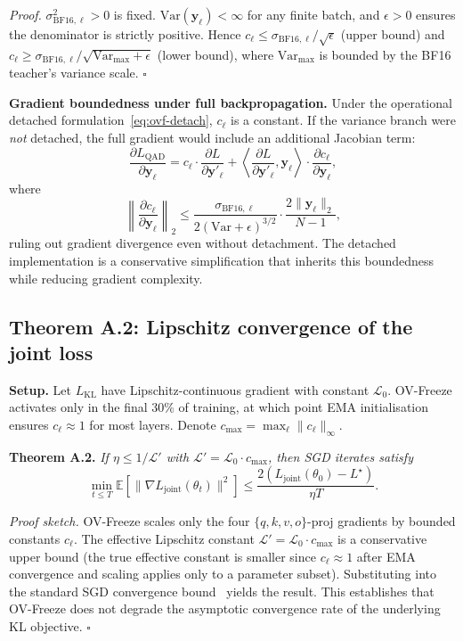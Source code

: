 \documentclass[lettersize,journal]{IEEEtran}
\begin{document}
\textit{Proof.}  $\sigma^2_{\mathrm{BF16},\ell}>0$ is fixed.
$\mathrm{Var}(\bm{y}_\ell)<\infty$ for any finite batch, and
$\epsilon>0$ ensures the denominator is strictly positive.  Hence
$c_\ell \le \sigma_{\mathrm{BF16},\ell}/\sqrt{\epsilon}$ (upper
bound) and $c_\ell \ge \sigma_{\mathrm{BF16},\ell}/\sqrt{
\mathrm{Var}_{\max}+\epsilon}$ (lower bound), where
$\mathrm{Var}_{\max}$ is bounded by the BF16 teacher's variance
scale. $\square$

\textbf{Gradient boundedness under full backpropagation.}
Under the operational detached formulation~\eqref{eq:ovf-detach},
$c_\ell$ is a constant.  If the variance branch were \emph{not}
detached, the full gradient would include an additional Jacobian term:
\[
  \frac{\partial L_{\mathrm{QAD}}}{\partial\bm{y}_\ell}
    = c_\ell\!\cdot\!\frac{\partial L}{\partial\bm{y}'_\ell}
    + \left\langle\frac{\partial L}{\partial\bm{y}'_\ell},\bm{y}_\ell\right\rangle
      \!\cdot\!\frac{\partial c_\ell}{\partial\bm{y}_\ell},
\]
where
\[
  \left\|\frac{\partial c_\ell}{\partial\bm{y}_\ell}\right\|_2
    \le \frac{\sigma_{\mathrm{BF16},\ell}}{2(\mathrm{Var}+\epsilon)^{3/2}}
        \cdot\frac{2\|\bm{y}_\ell\|_2}{N-1},
\]
ruling out gradient divergence even without detachment.  The detached
implementation is a conservative simplification that inherits this
boundedness while reducing gradient complexity.

\subsection{Theorem A.2: Lipschitz convergence of the joint loss}

\textbf{Setup.}  Let $L_{\mathrm{KL}}$ have Lipschitz-continuous
gradient with constant $\mathcal{L}_0$.  OV-Freeze activates only
in the final 30\% of training, at which point EMA initialisation
ensures $c_\ell \approx 1$ for most layers.  Denote $c_{\max} =
\max_\ell\|c_\ell\|_\infty$.

\textbf{Theorem A.2.}  \emph{If $\eta \le 1/\mathcal{L}'$ with
$\mathcal{L}'=\mathcal{L}_0\cdot c_{\max}$, then SGD iterates satisfy}
\[
  \min_{t\le T}\mathbb{E}\!\left[\|\nabla L_{\mathrm{joint}}(\theta_t)\|^2\right]
    \le \frac{2(L_{\mathrm{joint}}(\theta_0)-L^\star)}{\eta T}.
\]

\textit{Proof sketch.}  OV-Freeze scales only the four
$\{q,k,v,o\}$-proj gradients by bounded constants $c_\ell$.  The
effective Lipschitz constant $\mathcal{L}' = \mathcal{L}_0 \cdot
c_{\max}$ is a conservative upper bound (the true effective constant
is smaller since $c_\ell\approx 1$ after EMA convergence and scaling
applies only to a parameter subset).  Substituting into the standard
SGD convergence bound~\cite{bubeck2015} yields the result.  This
establishes that OV-Freeze does not degrade the asymptotic convergence
rate of the underlying KL objective. $\square$
\end{document}
